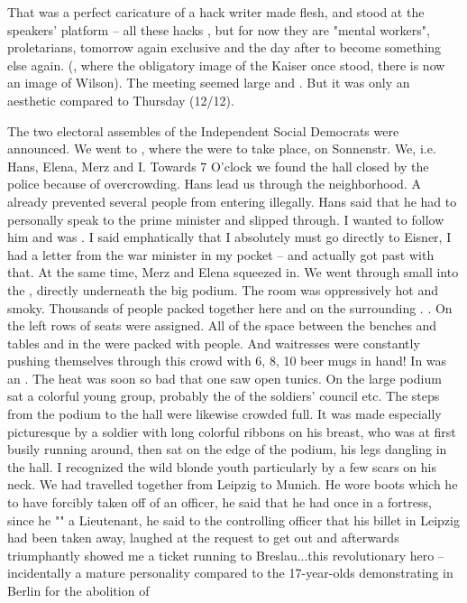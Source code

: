 That was a perfect caricature of a hack writer made flesh,  and stood at the speakers' platform -- all these hacks , but for now they are "mental workers", proletarians, tomorrow again exclusive and the day after to become something else again. (, where the obligatory image of the Kaiser once stood, there is now an image of Wilson). The meeting seemed large and . But it was only an aesthetic  compared to Thursday (12/12).

The two electoral assembles of the Independent Social Democrats were announced. We went to , where the  were to take place, on Sonnenstr. We, i.e. Hans, Elena, Merz and I. Towards 7 O'clock we found the hall closed by the police because of overcrowding. Hans lead us through the neighborhood. A  already prevented several people from entering illegally. Hans said that he had to personally speak to the prime minister and slipped through. I wanted to follow him and was . I said emphatically that I absolutely must go directly to Eisner, I had a letter from the war minister in my pocket -- and actually got past with that. At the same time, Merz and Elena squeezed in. We went through small  into the , directly underneath the big podium. The room was oppressively hot and smoky. Thousands of people packed together here and on the surrounding . . On the left rows of seats were assigned. All of the space between the benches and tables and in the  were packed with people. And waitresses were constantly pushing themselves through this crowd with 6, 8, 10 beer mugs in hand! In was an . The heat was soon so bad that one saw open tunics. On the large podium sat a colorful young group, probably the  of the soldiers' council etc. The steps from the podium to the hall were likewise crowded full. It was made especially picturesque by a soldier with long colorful ribbons on his breast, who was at first busily running around, then sat on the edge of the podium, his legs dangling in the hall. I recognized the wild blonde youth particularly by a few scars on his neck. We had travelled together from Leipzig to Munich. He wore boots which he  to have forcibly taken off of an officer, he said that he had once  in a fortress, since he "" a Lieutenant, he said to the controlling officer that his billet in Leipzig had been taken away, laughed at the request to get out and afterwards triumphantly showed me a ticket running to Breslau...this revolutionary hero -- incidentally a mature personality compared to the 17-year-olds demonstrating in Berlin for the abolition of 